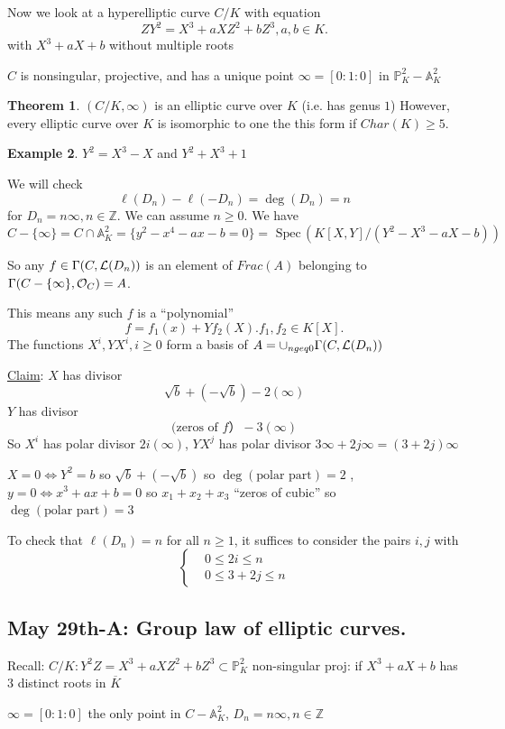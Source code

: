 \documentclass[11pt]{article}
\theoremstyle{definition}
\newtheorem{thm}{Theorem}[section]
\newtheorem{ex}[thm]{Example}
\newcommand{\spec}{\text{ Spec}\,}
\newcommand{\affn}{\mathbb A}
\newcommand{\proj}{\mathbb P}
\newcommand{\intg}{\mathbb Z}
\newcommand{\call}{{\cal L}}
\newcommand{\calo}{{\cal O}}
\newcommand{\Llrta}{\Longleftrightarrow}
\begin{document}
Now we look at a hyperelliptic  curve $C/K$ with equation
$$
ZY^2=X^3+aXZ^2+bZ^3, a, b\in K.
$$
with $X^3+aX+b$ without multiple roots 

$C$ is nonsingular, projective, and has a unique point $\infty=[0:1:0]$ in $\proj^2_K-\affn^2_K$

\begin{thm}$(C/K,\infty)$ is an elliptic curve over $K$ (i.e. has genus $1$) However, every elliptic curve over $K$ is isomorphic to one the this form if $Char(K)\geq 5$.
\end{thm}

\begin{ex}
$Y^2=X^3-X$ and $Y^2+X^3+1$
\end{ex}

We will check 
$$
\ell(D_n)-\ell(-D_n)=\deg(D_n)=n
$$
for $D_n=n\infty,n\in \intg$. We can assume $n\geq 0$. We have $C-\{\infty\}=C\cap \affn^2_K=\{y^2-x^4-ax-b=0\}=\spec(K[X,Y]/(Y^2-X^3-aX-b))$


So any  $f\in \Gamma(C,\call(D_n))$ is an element of $Frac(A)$ belonging to $\Gamma(C-\{\infty\},\calo_C)=A$.

This means any such $f$ is a ``polynomial'' 
$$
f=f_1(x)+Yf_2(X). f_1,f_2\in K[X].
$$
The functions $X^i, YX^i, i\geq 0 $ form a basis of  $A=\cup_{n geq 0}\Gamma(C,\call(D_n))$

\underline{Claim}: $X$ has divisor
$$
\sqrt{b}+(-\sqrt{b})-2(\infty)
$$
$Y$ has divisor
$$
(\text{zeros of  $f$}）-3(\infty)
$$
So $X^i$ has  polar divisor $2 i(\infty)$, $YX^j$ has polar divisor $3\infty+2j \infty=(3+2j)\infty$

$X=0\Llrta Y^2=b$ so $\sqrt{b}+(-\sqrt{b})$ so $\deg(\text{polar part})=2$
, $y=0\Llrta x^3+ax+b=0$ so $x_1+x_2+x_3$ ``zeros of cubic'' so $\deg(\text{polar part})=3$ 

To check that $\ell(D_n)=n$ for all $n\geq 1$, it suffices to consider the pairs $i,j$ with
$$
\left\{\begin{aligned}
& 0\leq 2i \leq n\\
& 0\leq 3+2j\leq n
\end{aligned}\right.
$$

\subsection{May 29th-A: Group law of elliptic curves.}
Recall:
$C/K:Y^2 Z=X^3+aXZ^2+bZ^3\subset \proj^2_K$
non-singular proj: if $X^3+aX+b$ has $3$ distinct roots in $\overline{K}$

$\infty=[0:1:0]$ the only point in $C-\affn^2_K$, $D_n=n\infty,n\in \intg$
\end{document}
